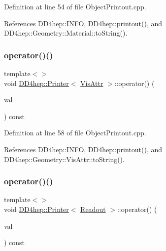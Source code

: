 Definition at line 54 of file Object\+Printout.\+cpp.



References D\+D4hep\+::\+I\+N\+FO, D\+D4hep\+::printout(), and D\+D4hep\+::\+Geometry\+::\+Material\+::to\+String().

\hypertarget{struct_d_d4hep_1_1_printer_a92db1cf77b2f6435c8089870281ac935}{}\label{struct_d_d4hep_1_1_printer_a92db1cf77b2f6435c8089870281ac935} 
\subsubsection{\texorpdfstring{operator()()}{operator()()}\hspace{0.1cm}{\footnotesize\ttfamily [5/12]}}
{\footnotesize\ttfamily template$<$$>$ \\
void \hyperlink{struct_d_d4hep_1_1_printer}{D\+D4hep\+::\+Printer}$<$ \hyperlink{class_d_d4hep_1_1_geometry_1_1_vis_attr}{Vis\+Attr} $>$\+::operator() (\begin{DoxyParamCaption}\item[{const \hyperlink{class_d_d4hep_1_1_geometry_1_1_vis_attr}{Vis\+Attr} \&}]{val }\end{DoxyParamCaption}) const}



Definition at line 58 of file Object\+Printout.\+cpp.



References D\+D4hep\+::\+I\+N\+FO, D\+D4hep\+::printout(), and D\+D4hep\+::\+Geometry\+::\+Vis\+Attr\+::to\+String().

\hypertarget{struct_d_d4hep_1_1_printer_ae454d20fdece1287a5999d338476f043}{}\label{struct_d_d4hep_1_1_printer_ae454d20fdece1287a5999d338476f043} 
\subsubsection{\texorpdfstring{operator()()}{operator()()}\hspace{0.1cm}{\footnotesize\ttfamily [6/12]}}
{\footnotesize\ttfamily template$<$$>$ \\
void \hyperlink{struct_d_d4hep_1_1_printer}{D\+D4hep\+::\+Printer}$<$ \hyperlink{class_d_d4hep_1_1_geometry_1_1_readout}{Readout} $>$\+::operator() (\begin{DoxyParamCaption}\item[{const \hyperlink{class_d_d4hep_1_1_geometry_1_1_readout}{Readout} \&}]{val }\end{DoxyParamCaption}) const}



